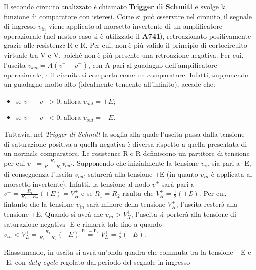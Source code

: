 \clearpage
Il secondo circuito analizzato è chiamato \textbf{Trigger di Schmitt} e svolge la funzione di comparatore con isteresi. 
Come si può osservare nel circuito, il segnale di ingresso $v_{in}$ viene applicato al morsetto invertente di un amplificatore operazionale (nel nostro caso si è utilizzato il \textbf{\textmu A741}), retroazionato positivamente grazie alle resistenze R e R. Per cui, non è più valido il principio di cortocircuito virtuale tra V\super{+} e V\super{-}, poiché non è più presente una retroazione negativa. Per cui, l'uscita $v_{out}=A(v^+-v^-)$, con A pari al guadagno dell'amplificatore operazionale, e il circuito si comporta come un comparatore. Infatti, supponendo un guadagno molto alto (idealmente tendente all'infinito), accade che:
\begin{itemize}
	\item se $v^+-v^->0$, allora $v_{out}=+E$;
	\item se $v^+-v^-<0$, allora $v_{out}=-E$.
\end{itemize}
Tuttavia, nel \textit{Trigger di Schmitt} la soglia alla quale l'uscita passa dalla tensione di saturazione positiva a quella negativa è diversa rispetto a quella presentata di un normale comparatore. Le resistenze R e R definiscono un partitore di tensione per cui $v^+=\frac{R_1}{R_1+R_2}v_{out}$. Supponendo che inizialmente la tensione $v_{in}$ sia pari a -E, di conseguenza l'uscita $v_{out}$ saturerà alla tensione +E (in quanto $v_{in}$ è applicata al morsetto invertente). Infatti, la tensione al nodo $v^+$ sarà pari a $v^+=\frac{R_1}{R_1+R_2}(+E)=V_H^+$ e se $R_1=R_2$ risulta che $V_H^+=\frac{1}{2}(+E)$. Per cui, fintanto che la tensione $v_{in}$ sarà minore della tensione $V_H^+$, l'uscita resterà alla tensione +E. Quando si avrà che $v_{in}>V_H^+$, l'uscita si porterà alla tensione di saturazione negativa -E e rimarrà tale fino a quando $v_{in}<V_L^+=\frac{R_1}{R_1+R_2}(-E)\overset{\mathrm{R_1=R_2}}{=}V_L^+=\frac{1}{2}(-E)$. 

\noindent
Riassumendo, in uscita si avrà un'onda quadra che commuta tra la tensione +E e -E, con \textit{duty-cycle} regolato dal periodo del segnale in ingresso



